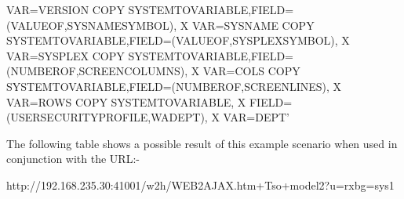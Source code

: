 \documentclass[letterpaper,10pt,english]{sphinxmanual}
\begin{document}
\begin{sphinxVerbatim}[commandchars=\\\{\}]
    VAR=\PYGZsq{}VERSION\PYGZsq{}
COPY\PYGZdl{} SYSTEM\PYGZhy{}TO\PYGZhy{}VARIABLE,FIELD=(VALUE\PYGZhy{}OF,SYSNAME\PYGZhy{}SYMBOL),      X
    VAR=\PYGZsq{}SYSNAME\PYGZsq{}
COPY\PYGZdl{} SYSTEM\PYGZhy{}TO\PYGZhy{}VARIABLE,FIELD=(VALUE\PYGZhy{}OF,SYSPLEX\PYGZhy{}SYMBOL),      X
    VAR=\PYGZsq{}SYSPLEX\PYGZsq{}
COPY\PYGZdl{} SYSTEM\PYGZhy{}TO\PYGZhy{}VARIABLE,FIELD=(NUMBER\PYGZhy{}OF,SCREEN\PYGZhy{}COLUMNS),     X
    VAR=\PYGZsq{}COLS\PYGZsq{}
COPY\PYGZdl{} SYSTEM\PYGZhy{}TO\PYGZhy{}VARIABLE,FIELD=(NUMBER\PYGZhy{}OF,SCREEN\PYGZhy{}LINES),       X
    VAR=\PYGZsq{}ROWS\PYGZsq{}
COPY\PYGZdl{} SYSTEM\PYGZhy{}TO\PYGZhy{}VARIABLE,                                      X
    FIELD=(USER\PYGZhy{}SECURITY\PYGZhy{}PROFILE,WADEPT),                      X
    VAR=\PYGZsq{}DEPT’
\end{sphinxVerbatim}

The following table shows a possible result of this example scenario when used in conjunction with the URL:-

\begin{sphinxVerbatim}[commandchars=\\\{\}]
http://192.168.235.30:41001/w2h/WEB2AJAX.htm+Tso+model2?u=rxb\PYGZam{}g=sys1
\end{sphinxVerbatim}
\end{document}

